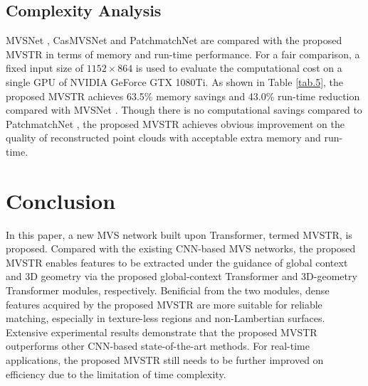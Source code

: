\documentclass[10pt,twocolumn,letterpaper]{article}
\begin{document}
\subsection{Complexity Analysis}
MVSNet \cite{mvsnet}, CasMVSNet \cite{casmvsnet} and PatchmatchNet \cite{patchmatchnet} are compared with the proposed MVSTR in terms of memory and run-time performance. For a fair comparison, a fixed input size of $1152\times864$ is used to evaluate the computational cost on a single GPU of NVIDIA GeForce GTX 1080Ti. As shown in Table \ref{tab.5}, the proposed MVSTR achieves 63.5\% memory savings and 43.0\% run-time reduction compared with MVSNet \cite{mvsnet}. Though there is no computational savings compared to PatchmatchNet \cite{patchmatchnet}, the proposed MVSTR achieves obvious improvement on the quality of reconstructed point clouds with acceptable extra memory and run-time.  

\section{Conclusion}
In this paper, a new MVS network built upon Transformer, termed MVSTR, is proposed. Compared with the existing CNN-based MVS networks, the proposed MVSTR enables features to be extracted under the guidance of global context and 3D geometry via the proposed global-context Transformer and 3D-geometry Transformer modules, respectively. Benificial from the two modules, dense features acquired by the proposed MVSTR are more suitable for reliable matching, especially in texture-less regions and non-Lambertian surfaces. Extensive experimental results  demonstrate that the proposed MVSTR outperforms other CNN-based state-of-the-art methods. For real-time applications, the proposed MVSTR still needs to be further improved on efficiency due to the limitation of time complexity.

{\small


}
\end{document}
